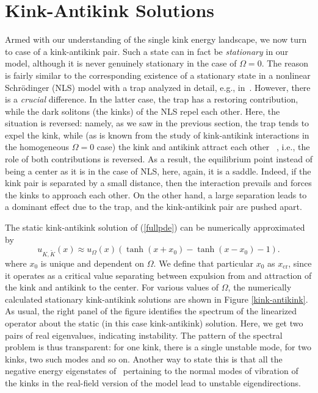 \documentclass[vecphys]{svmult}		%
\begin{document}
 

 \section{Kink-Antikink Solutions}

Armed with our understanding of the single kink energy landscape, we now turn to case of a kink-antikink pair. Such a state can in
fact be {\it stationary} in our model, although it is never genuinely
stationary in the case of $\Omega=0$. The reason is fairly similar
to the corresponding existence of a stationary state in a nonlinear
Schr{\"o}dinger (NLS) model with a trap
analyzed in detail, e.g., in~\cite{coles}.
However, there is a {\it crucial} difference. In the latter
case, the trap has a restoring contribution, while the
dark solitons (the kinks) of the NLS repel each other. Here, the situation is
reversed: namely, as we saw in the previous section,
the trap tends to expel the kink, while (as is known from the
study of kink-antikink interactions in the homogeneous $\Omega=0$
case) the kink and antikink attract each other ~\cite{anninos,campbell},
i.e., the role of both
contributions is reversed. As a result, the equilibrium point
instead of being a center as it is in the case of NLS, here, again,
it is a saddle. Indeed, if the kink pair is separated by a small
distance, then the interaction prevails and forces the kinks to
approach each other. On the other hand, a large separation
leads to a dominant effect due to the trap, and the kink-antikink
pair are pushed apart.

The static kink-antikink solution of (\ref{fullpde})
can be numerically approximated by 
\begin{equation}u_{K,\tilde{K}} (x) \approx  u_{\Omega}(x) (\tanh (x+x_0)-\tanh (x-x_0)-1).
\label{static_kink-antikink}
\end{equation}
where $x_0$ is unique and dependent on $\Omega$. We define that particular $x_0$ as $x_\mathrm{cr}$, since it operates as a critical value separating
between expulsion from and attraction of the kink and antikink to the center. 
For various values of $\Omega$, the numerically calculated
stationary kink-antikink solutions are shown in Figure \ref{kink-antikink}.
As usual, the right panel of the figure identifies the spectrum of the linearized operator about the static (in this case kink-antikink) solution.
Here, we get two pairs of real eigenvalues, indicating instability.
The pattern of the spectral problem is thus transparent: for one kink,
there is a single unstable mode, for two kinks, two such modes and
so on. Another way to state this is that  all the negative energy eigenstates
of~\cite{coles} pertaining to the normal modes of vibration of the kinks
in the real-field version of the model lead to unstable eigendirections.
\end{document}
